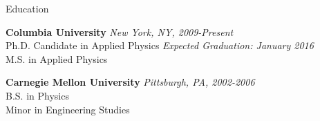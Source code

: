 \documentclass{resume} %
\begin{document}

\begin{rSection}{Education}

{\bf Columbia University } \hfill {\em New York, NY, 2009-Present} \\ 
Ph.D. Candidate in Applied Physics \hfill {\em  Expected Graduation: January 2016} \\
M.S. in Applied Physics\smallskip 

{\bf Carnegie Mellon University } \hfill {\em Pittsburgh, PA, 2002-2006} \\ 
B.S. in Physics \\
Minor in Engineering Studies \smallskip

\end{rSection}

\end{document}
